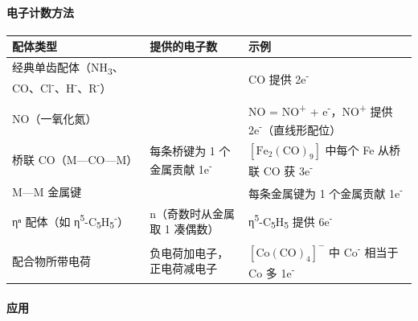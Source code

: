 \documentclass[a4paper,11pt]{ctexart}
\newcounter{none}
\begin{document}
\paragraph{电子计数方法}\label{ux7535ux5b50ux8ba1ux6570ux65b9ux6cd5}

{\def\LTcaptype{none} %
\begin{longtable}[]{@{}
  >{\raggedright\arraybackslash}p{}
  >{\centering\arraybackslash}p{}
  >{\raggedright\arraybackslash}p{}@{}}
\toprule\noalign{}
\begin{minipage}[b]{\linewidth}\raggedright
配体类型
\end{minipage} & \begin{minipage}[b]{\linewidth}\centering
提供的电子数
\end{minipage} & \begin{minipage}[b]{\linewidth}\raggedright
示例
\end{minipage} \\
\midrule\noalign{}
\endhead
\bottomrule\noalign{}
\endlastfoot
经典单齿配体（NH\textsubscript{3}、CO、Cl\textsuperscript{-}、H\textsuperscript{-}、R\textsuperscript{-}） & 2 & CO 提供 2e\textsuperscript{-} \\
NO（一氧化氮） & 3 & NO = NO\textsuperscript{+} + e\textsuperscript{-}，NO\textsuperscript{+} 提供 2e\textsuperscript{-}（直线形配位） \\
桥联 CO（M---CO---M） & 每条桥键为 1 个金属贡献 1e\textsuperscript{-} & \([\mathrm{Fe_2(CO)_9}]\) 中每个 Fe 从桥联 CO 获 3e\textsuperscript{-} \\
M---M 金属键 & 1 & 每条金属键为 1 个金属贡献 1e\textsuperscript{-} \\
ηⁿ 配体（如 η\textsuperscript{5}-C\textsubscript{5}H\textsubscript{5}\textsuperscript{-}） & n（奇数时从金属取 1 凑偶数） & η\textsuperscript{5}-C\textsubscript{5}H\textsubscript{5} 提供 6e\textsuperscript{-} \\
配合物所带电荷 & 负电荷加电子，正电荷减电子 & \([\mathrm{Co(CO)_4}]^-\) 中 Co\textsuperscript{-} 相当于 Co 多 1e\textsuperscript{-} \\
\end{longtable}
}

\paragraph{应用}\label{ux5e94ux7528}
\end{document}

